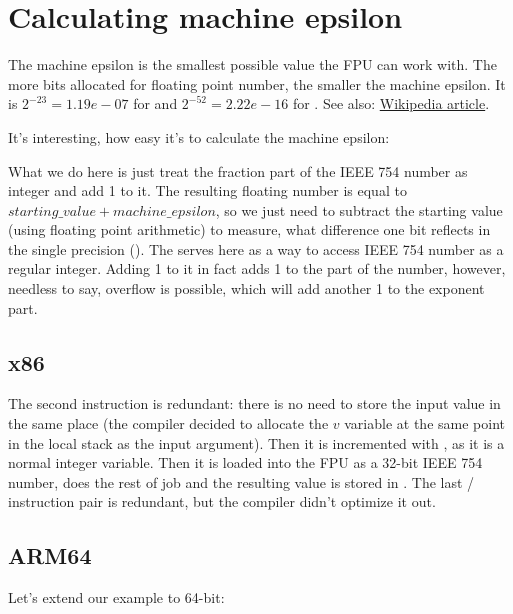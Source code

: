 ﻿\section{Calculating machine epsilon}

The machine epsilon is the smallest possible value the \ac{FPU} can work with.
The more bits allocated for floating point number, the smaller the machine epsilon.
It is $2^{-23} = 1.19e-07$ for \Tfloat and $2^{-52} = 2.22e-16$ for \Tdouble.
See also: \href{http://link.yurichev.com/17367}{Wikipedia article}.%

It's interesting, how easy it's to calculate the machine epsilon:



What we do here is just treat the fraction part of the IEEE 754 number as integer and add 1 to it.
The resulting floating number is equal to $starting\_value+machine\_epsilon$, so we just need to subtract
the starting value (using floating point arithmetic) to measure, what difference one bit reflects
in the single precision (\Tfloat).
The  serves here as a way to access IEEE 754 number as a regular integer.
Adding 1 to it in fact adds 1 to the  part of the number, however, needless to say,
overflow is possible, which will add another 1 to the exponent part.

\subsection{x86}



The second  instruction is redundant: there is no need to store the input value in the same
place (the compiler decided to allocate the $v$ variable at the same point in the local stack as the input 
argument).
Then it is incremented with , as it is a normal integer variable.
Then it is loaded into the FPU as a 32-bit IEEE 754 number,  does the rest of job and the resulting
value is stored in .
The last / instruction pair is redundant, but the compiler didn't optimize it out.

\subsection{ARM64}

Let's extend our example to 64-bit:

